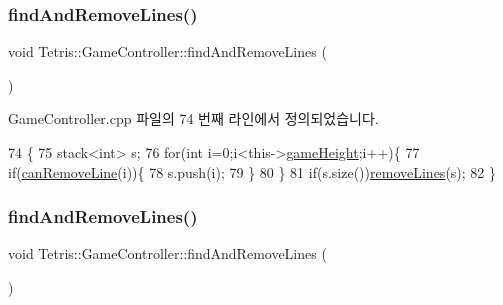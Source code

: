 \subsubsection{\texorpdfstring{find\+And\+Remove\+Lines()}{findAndRemoveLines()}\hspace{0.1cm}{\footnotesize\ttfamily [1/2]}}
{\footnotesize\ttfamily void Tetris\+::\+Game\+Controller\+::find\+And\+Remove\+Lines (\begin{DoxyParamCaption}{ }\end{DoxyParamCaption})}



Game\+Controller.\+cpp 파일의 74 번째 라인에서 정의되었습니다.


\begin{DoxyCode}
74                                            \{
75                 stack<int> s;
76                 \textcolor{keywordflow}{for}(\textcolor{keywordtype}{int} i=0;i<this->\hyperlink{class_tetris_1_1_game_controller_a8e3adc647ed382de0ff541417bea9b33}{gameHeight};i++)\{
77                     \textcolor{keywordflow}{if}(\hyperlink{class_tetris_1_1_game_controller_a912bb473994e869a610ab356086cb0ad}{canRemoveLine}(i))\{
78                         s.push(i);
79                     \}
80                 \}
81                 \textcolor{keywordflow}{if}(s.size())\hyperlink{class_tetris_1_1_game_controller_aa95d44d0084ac5537f1c753796df4565}{removeLines}(s); 
82             \}
\end{DoxyCode}
\mbox{\label{class_tetris_1_1_game_controller_ab19e8563acc9e724e130de60f87600b7}} 
\subsubsection{\texorpdfstring{find\+And\+Remove\+Lines()}{findAndRemoveLines()}\hspace{0.1cm}{\footnotesize\ttfamily [2/2]}}
{\footnotesize\ttfamily void Tetris\+::\+Game\+Controller\+::find\+And\+Remove\+Lines (\begin{DoxyParamCaption}{ }\end{DoxyParamCaption})\hspace{0.3cm}{\ttfamily [inline]}}




